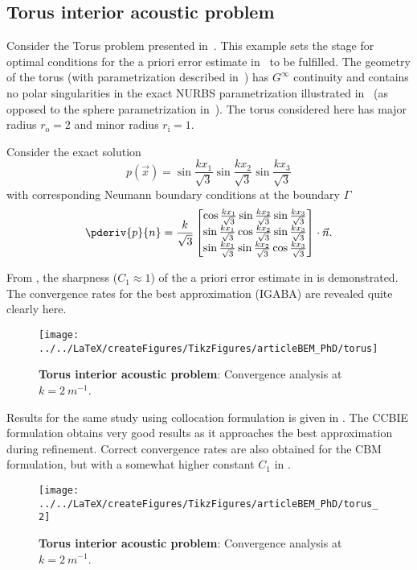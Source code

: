 \subsection{Torus interior acoustic problem}
Consider the Torus problem presented in~\cite{Simpson2014aib}. This example sets the stage for optimal conditions for the a priori error estimate in~ to be fulfilled. The geometry of the torus (with parametrization described in~) has $G^\infty$ continuity and contains no polar singularities in the exact NURBS parametrization illustrated in~ (as opposed to the sphere parametrization in~). The torus considered here has major radius $r_{\mathrm{o}} = 2$ and minor radius $r_{\mathrm{i}}=1$. 

Consider the exact solution
\begin{equation*}
	p(\vec{x}) = \sin\frac{kx_1}{\sqrt{3}}\sin\frac{kx_2}{\sqrt{3}}\sin\frac{kx_3}{\sqrt{3}}
\end{equation*}
with corresponding Neumann boundary conditions at the boundary $\Gamma$
\begin{equation*}
	\pderiv{p}{n} = \frac{k}{\sqrt{3}}\begin{bmatrix}
	\cos\frac{kx_1}{\sqrt{3}}\sin\frac{kx_2}{\sqrt{3}}\sin\frac{kx_3}{\sqrt{3}}\\
	\sin\frac{kx_1}{\sqrt{3}}\cos\frac{kx_2}{\sqrt{3}}\sin\frac{kx_3}{\sqrt{3}}\\
	\sin\frac{kx_1}{\sqrt{3}}\sin\frac{kx_2}{\sqrt{3}}\cos\frac{kx_3}{\sqrt{3}}
	\end{bmatrix}\cdot\vec{n}.
\end{equation*}

From , the sharpness ($C_1 \approx 1$) of the a priori error estimate in  is demonstrated. The convergence rates for the best approximation (IGABA) are revealed quite clearly here. 
\begin{figure}
	\centering
	\texttt{[image: ../../LaTeX/createFigures/TikzFigures/articleBEM\_PhD/torus]}
	\caption{\textbf{Torus interior acoustic problem}: Convergence analysis at $k=\SI{2}{m^{-1}}$.}
	\label{Fig3:torus}
\end{figure}

Results for the same study using collocation formulation is given in . The CCBIE formulation obtains very good results as it approaches the best approximation during refinement. Correct convergence rates are also obtained for the CBM formulation, but with a somewhat higher constant $C_1$ in .
\begin{figure}
	\centering
	\texttt{[image: ../../LaTeX/createFigures/TikzFigures/articleBEM\_PhD/torus\_2]}
	\caption{\textbf{Torus interior acoustic problem}: Convergence analysis at $k=\SI{2}{m^{-1}}$.}
	\label{Fig3:torus_2}
\end{figure}

